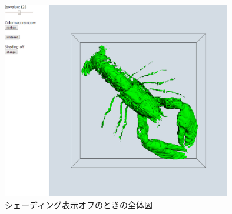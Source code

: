 ﻿\documentclass[a4paper,10pt,fleqn]{jarticle}
\begin{document}
\begin{figure}[H]
\renewcommand{\figurename}{Fig.}
\begin{center}
\includegraphics[width=10cm,bb=0 0 1041 899]{shading.png}
\caption{シェーディング表示オフのときの全体図}
\label{shading}
\end{center}
\end{figure}
\end{document}
